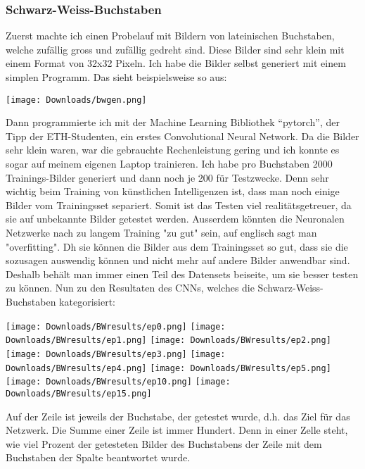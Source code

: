 \documentclass[11pt,a4paper,ngerman]{article}
\begin{document}
\subsubsection{Schwarz-Weiss-Buchstaben}

Zuerst machte ich einen Probelauf mit Bildern von lateinischen Buchstaben, welche zufällig gross und zufällig gedreht sind. Diese Bilder sind sehr klein mit einem Format von 32x32 Pixeln. Ich habe die Bilder selbst generiert mit einem simplen Programm. Das sieht beispielsweise so aus:

\begin{center}
    \texttt{[image: Downloads/bwgen.png]}
\end{center}

Dann programmierte ich mit der Machine Learning Bibliothek \enquote{pytorch}, der Tipp der ETH-Studenten, ein erstes Convolutional Neural Network. Da die Bilder sehr klein waren, war die gebrauchte Rechenleistung gering und ich konnte es sogar auf meinem eigenen Laptop trainieren. Ich habe pro Buchstaben 2000 Trainings-Bilder generiert und dann noch je 200 für Testzwecke. Denn sehr wichtig beim Training von künstlichen Intelligenzen ist, dass man noch einige Bilder vom Trainingsset separiert. Somit ist das Testen viel realitätsgetreuer, da sie auf unbekannte Bilder getestet werden. Ausserdem könnten die Neuronalen Netzwerke nach zu langem Training "zu gut" sein, auf englisch sagt man "overfitting". Dh sie können die Bilder aus dem Trainingsset so gut, dass sie die sozusagen auswendig können und nicht mehr auf andere Bilder anwendbar sind. Deshalb behält man immer einen Teil des Datensets beiseite, um sie besser testen zu können. Nun zu den Resultaten des CNNs, welches die Schwarz-Weiss-Buchstaben kategorisiert:

\begin{center}
    \texttt{[image: Downloads/BWresults/ep0.png]}
    \texttt{[image: Downloads/BWresults/ep1.png]}
    \texttt{[image: Downloads/BWresults/ep2.png]}
    \texttt{[image: Downloads/BWresults/ep3.png]}
    \texttt{[image: Downloads/BWresults/ep4.png]}
    \texttt{[image: Downloads/BWresults/ep5.png]}
    \texttt{[image: Downloads/BWresults/ep10.png]}
    \texttt{[image: Downloads/BWresults/ep15.png]}
\end{center}

Auf der Zeile ist jeweils der Buchstabe, der getestet wurde, d.h. das Ziel für das Netzwerk. Die Summe einer Zeile ist immer Hundert. Denn in einer Zelle steht, wie viel Prozent der getesteten Bilder des Buchstabens der Zeile mit dem Buchstaben der Spalte beantwortet wurde.\\
\end{document}
